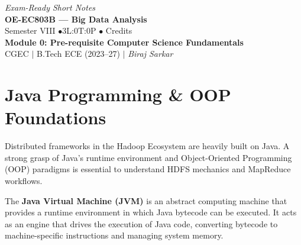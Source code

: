 \documentclass[12pt,a4paper]{article}
\begin{document}
\begin{center}
  \hfill \textit{Exam-Ready Short Notes} \\
  \vspace{6pt}
  {\LARGE\bfseries\color{myred} OE-EC803B --- Big Data Analysis}\\[5pt]
  {\normalsize\color{mydark} Semester VIII \quad$\bullet$\quad 3L:0T:0P \quad$\bullet$ Credits}\\[3pt]
  {\normalsize\color{myteal}\textbf{Module 0: Pre-requisite Computer Science Fundamentals}}\\[3pt]
  {\small\color{mydark} CGEC \;$|$\; B.Tech ECE (2023--27) \;$|$\; \textit{Biraj Sarkar}}
\end{center}
\vspace{2pt}
\noindent{\color{myred}\rule{\linewidth}{1.5pt}}
\vspace{2pt}

\hypersetup{linkcolor=mydark}
\tableofcontents
\hypersetup{linkcolor=myteal}
\newpage

\section{Java Programming \& OOP Foundations}

Distributed frameworks in the Hadoop Ecosystem are heavily built on Java. A strong grasp of Java's runtime environment and Object-Oriented Programming (OOP) paradigms is essential to understand HDFS mechanics and MapReduce workflows.

\begin{tcolorbox}[defbox, title={Java Virtual Machine (JVM)}]
  The \textbf{Java Virtual Machine (JVM)} is an abstract computing machine that provides a runtime environment in which Java bytecode can be executed. It acts as an engine that drives the execution of Java code, converting bytecode to machine-specific instructions and managing system memory.
\end{tcolorbox}
\end{document}

